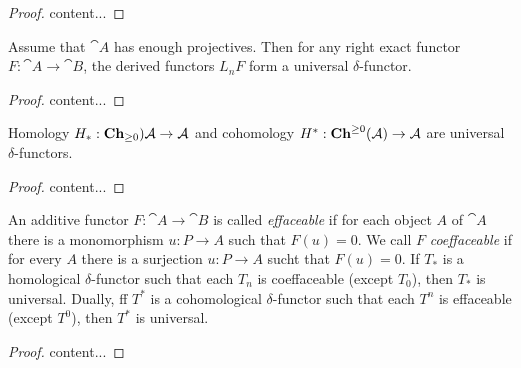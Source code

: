 \begin{proof}
	content...
\end{proof}

\begin{theorem}
	Assume that $\cat{A}$ has enough projectives. Then for any right exact functor $F:\cat{A}\rightarrow\cat{B}$, the derived functors $L_nF$ form a universal $\delta$-functor.
\end{theorem}

\begin{proof}
	content...
\end{proof}

\begin{exercise}
	Homology $H_*:\operatorname{\textbf{Ch}}_{\geq0})\mathcal{A}\rightarrow\mathcal{A}$ and cohomology $H^*:\operatorname{\textbf{Ch}}^{\geq0}(\mathcal{A})\rightarrow\mathcal{A}$ are universal $\delta$-functors.
\end{exercise}

\begin{proof}
	content...
\end{proof}

\begin{exercise}
	An additive functor $F:\cat{A}\rightarrow\cat{B}$ is called \textit{effaceable} if for each object $A$ of $\cat{A}$ there is a monomorphism $u:P\rightarrow A$ such that $F(u)=0$.
	We call $F$ \textit{coeffaceable} if for every $A$ there is a surjection $u:P\rightarrow A$ sucht that $F(u)=0$.
	If $T_*$ is a homological $\delta$-functor such that each $T_n$ is coeffaceable (except $T_0$), then $T_*$ is universal.
	Dually, ff $T^*$ is a cohomological $\delta$-functor such that each $T^n$ is effaceable (except $T^0$), then $T^*$ is universal.
\end{exercise}

\begin{proof}
	content...
\end{proof}